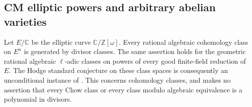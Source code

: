 \subsection{CM elliptic powers and arbitrary abelian varieties}

\begin{proposition}
Let $E/\mathbb C$ be the elliptic curve $\mathbb C/\mathbb Z[\omega]$. Every rational algebraic cohomology class on $E^n$ is generated by divisor classes. The same assertion holds for the geometric rational algebraic $\ell$-adic classes on powers of every good finite-field reduction of $E$. The Hodge standard conjecture on these class spaces is consequently an unconditional instance of \cite[Remarks~3.7--3.8]{MilnePolarizations}. This concerns cohomology classes, and makes no assertion that every Chow class or every class modulo algebraic equivalence is a polynomial in divisors.
\end{proposition}

